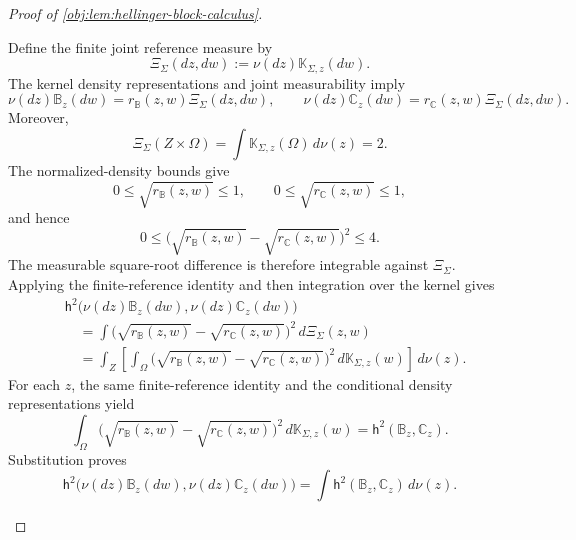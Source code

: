\documentclass[11pt]{article}
\begin{document}
\begin{proof}[Proof of \cref{obj:lem:hellinger-block-calculus}]
\begin{enumerate}
Define the finite joint reference measure by
\[
\Xi_{\Sigma}(dz,dw):=\nu(dz)\mathbb K_{\Sigma,z}(dw).
\]
The kernel density representations and joint measurability imply
\[
\nu(dz)\mathbb B_z(dw)
   =r_{\mathbb B}(z,w)\Xi_{\Sigma}(dz,dw),
\qquad
\nu(dz)\mathbb C_z(dw)
   =r_{\mathbb C}(z,w)\Xi_{\Sigma}(dz,dw).
\]
Moreover,
\[
\Xi_{\Sigma}(Z\times\Omega)
=\int\mathbb K_{\Sigma,z}(\Omega)\,d\nu(z)=2.
\]
The normalized-density bounds give
\[
0\le\sqrt{r_{\mathbb B}(z,w)}\le1,
\qquad
0\le\sqrt{r_{\mathbb C}(z,w)}\le1,
\]
and hence
\[
0\le
\bigl(\sqrt{r_{\mathbb B}(z,w)}
      -\sqrt{r_{\mathbb C}(z,w)}\bigr)^2
\le4.
\]
The measurable square-root difference is therefore integrable against \(\Xi_{\Sigma}\). Applying the finite-reference identity and then integration over the kernel gives
\[
\begin{aligned}
&\mathsf h^2\bigl(\nu(dz)\mathbb B_z(dw),
                 \nu(dz)\mathbb C_z(dw)\bigr)\\
&\quad=
\int
\bigl(\sqrt{r_{\mathbb B}(z,w)}
      -\sqrt{r_{\mathbb C}(z,w)}\bigr)^2
\,d\Xi_{\Sigma}(z,w)\\
&\quad=
\int_Z
\left[
\int_\Omega
\bigl(\sqrt{r_{\mathbb B}(z,w)}
      -\sqrt{r_{\mathbb C}(z,w)}\bigr)^2
\,d\mathbb K_{\Sigma,z}(w)
\right]\,d\nu(z).
\end{aligned}
\]
For each \(z\), the same finite-reference identity and the conditional density representations yield
\[
\int_\Omega
\bigl(\sqrt{r_{\mathbb B}(z,w)}
      -\sqrt{r_{\mathbb C}(z,w)}\bigr)^2
\,d\mathbb K_{\Sigma,z}(w)
=
\mathsf h^2(\mathbb B_z,\mathbb C_z).
\]
Substitution proves
\[
\mathsf h^2\bigl(\nu(dz)\mathbb B_z(dw),
                \nu(dz)\mathbb C_z(dw)\bigr)
=
\int\mathsf h^2(\mathbb B_z,\mathbb C_z)\,d\nu(z).
\]


\end{enumerate}
\end{proof}
\end{document}

